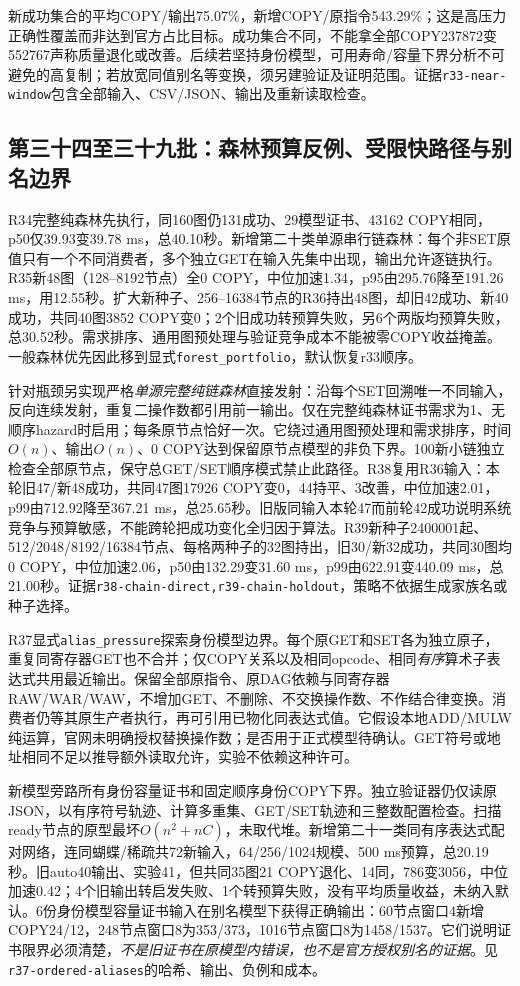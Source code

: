 \documentclass[UTF8,11pt,fontset=fandol]{ctexart}
\begin{document}
新成功集合的平均COPY/输出75.07\%，新增COPY/原指令543.29\%；这是高压力正确性覆盖而非达到官方占比目标。成功集合不同，不能拿全部COPY237872变552767声称质量退化或改善。后续若坚持身份模型，可用寿命/容量下界分析不可避免的高复制；若放宽同值别名等变换，须另建验证及证明范围。证据\texttt{r33-near-window}包含全部输入、CSV/JSON、输出及重新读取检查。

\subsection{第三十四至三十九批：森林预算反例、受限快路径与别名边界}
R34完整纯森林先执行，同160图仍131成功、29模型证书、43162 COPY相同，p50仅39.93变39.78 ms，总40.10秒。新增第二十类单源串行链森林：每个非SET原值只有一个不同消费者，多个独立GET在输入先集中出现，输出允许逐链执行。R35新48图（128--8192节点）全0 COPY，中位加速1.34，p95由295.76降至191.26 ms，用12.55秒。扩大新种子、256--16384节点的R36持出48图，却旧42成功、新40成功，共同40图3852 COPY变0；2个旧成功转预算失败，另6个两版均预算失败，总30.52秒。需求排序、通用图预处理与验证竞争成本不能被零COPY收益掩盖。一般森林优先因此移到显式\texttt{forest\_portfolio}，默认恢复r33顺序。

针对瓶颈另实现严格\emph{单源完整纯链森林}直接发射：沿每个SET回溯唯一不同输入，反向连续发射，重复二操作数都引用前一输出。仅在完整纯森林证书需求为1、无顺序hazard时启用；每条原节点恰好一次。它绕过通用图预处理和需求排序，时间$O(n)$、输出$O(n)$、0 COPY达到保留原节点模型的非负下界。100新小链独立检查全部原节点，保守总GET/SET順序模式禁止此路径。R38复用R36输入：本轮旧47/新48成功，共同47图17926 COPY变0，44持平、3改善，中位加速2.01，p99由712.92降至367.21 ms，总25.65秒。旧版同输入本轮47而前轮42成功说明系统竞争与预算敏感，不能跨轮把成功变化全归因于算法。R39新种子2400001起、512/2048/8192/16384节点、每格两种子的32图持出，旧30/新32成功，共同30图均0 COPY，中位加速2.06，p50由132.29变31.60 ms，p99由622.91变440.09 ms，总21.00秒。证据\texttt{r38-chain-direct,r39-chain-holdout}，策略不依据生成家族名或种子选择。

R37显式\texttt{alias\_pressure}探索身份模型边界。每个原GET和SET各为独立原子，重复同寄存器GET也不合并；仅COPY关系以及相同opcode、相同\emph{有序}算术子表达式共用最近输出。保留全部原指令、原DAG依赖与同寄存器RAW/WAR/WAW，不增加GET、不删除、不交换操作数、不作结合律变换。消费者仍等其原生产者执行，再可引用已物化同表达式值。它假设本地ADD/MULW纯运算，官网未明确授权替换操作数；是否用于正式模型待确认。GET符号或地址相同不足以推导额外读取允许，实验不依赖这种许可。

新模型旁路所有身份容量证书和固定顺序身份COPY下界。独立验证器仍仅读原JSON，以有序符号轨迹、计算多重集、GET/SET轨迹和三整数配置检查。扫描ready节点的原型最坏$O(n^2+nC)$，未取代堆。新增第二十一类同有序表达式配对网络，连同蝴蝶/稀疏共72新输入，64/256/1024规模、500 ms预算，总20.19秒。旧auto40输出、实验41，但共同35图21 COPY退化、14同，786变3056，中位加速0.42；4个旧输出转启发失败、1个转预算失败，没有平均质量收益，未纳入默认。6份身份模型容量证书输入在别名模型下获得正确输出：60节点窗口4新增COPY24/12，248节点窗口8为353/373，1016节点窗口8为1458/1537。它们说明证书限界必须清楚，\emph{不是旧证书在原模型内错误，也不是官方授权别名的证据}。见\texttt{r37-ordered-aliases}的哈希、输出、负例和成本。
\end{document}
